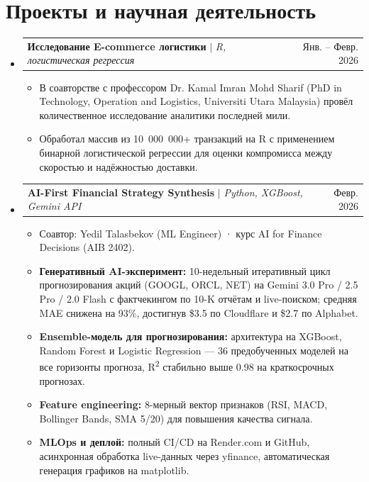 \documentclass[letterpaper,11pt]{article}
\makeatletter
\newcommand{\resumeItem}[1]{
  \item\small{
    {#1 \vspace{-2pt}}
  }
}
\newcommand{\resumeProjectHeading}[2]{
    \item
    \begin{tabular*}{0.97\textwidth}{l@{\extracolsep{\fill}}r}
      \small#1 & #2 \\
    \end{tabular*}\vspace{-7pt}
}
\newcommand{\resumeSubHeadingListStart}{\begin{itemize}[leftmargin=0.15in, label={}]}
\newcommand{\resumeSubHeadingListEnd}{\end{itemize}}
\newcommand{\resumeItemListStart}{\begin{itemize}}
\newcommand{\resumeItemListEnd}{\end{itemize}\vspace{-5pt}}
\makeatother
\begin{document}
\section{Проекты и научная деятельность}
    \resumeSubHeadingListStart
      \resumeProjectHeading
          {\textbf{Исследование E-commerce логистики} $|$ \emph{R, логистическая регрессия}}{Янв. -- Февр. 2026}
          \resumeItemListStart
            \resumeItem{В соавторстве с профессором Dr. Kamal Imran Mohd Sharif (PhD in Technology, Operation and Logistics, Universiti Utara Malaysia) провёл количественное исследование аналитики последней мили.}
            \resumeItem{Обработал массив из 10~000~000+ транзакций на R с применением бинарной логистической регрессии для оценки компромисса между скоростью и надёжностью доставки.}
          \resumeItemListEnd
      \resumeProjectHeading
          {\textbf{AI-First Financial Strategy Synthesis} $|$ \emph{Python, XGBoost, Gemini API}}{Февр. 2026}
          \resumeItemListStart
            \resumeItem{Соавтор: Yedil Talasbekov (ML Engineer) · курс AI for Finance Decisions (AIB 2402).}
            \resumeItem{\textbf{Генеративный AI-эксперимент:} 10-недельный итеративный цикл прогнозирования акций (GOOGL, ORCL, NET) на Gemini 3.0 Pro / 2.5 Pro / 2.0 Flash с фактчекингом по 10-K отчётам и live-поиском; средняя MAE снижена на 93\%, достигнув \$3.5 по Cloudflare и \$2.7 по Alphabet.}
            \resumeItem{\textbf{Ensemble-модель для прогнозирования:} архитектура на XGBoost, Random Forest и Logistic Regression — 36 предобученных моделей на все горизонты прогноза, R\textsuperscript{2} стабильно выше 0.98 на краткосрочных прогнозах.}
            \resumeItem{\textbf{Feature engineering:} 8-мерный вектор признаков (RSI, MACD, Bollinger Bands, SMA 5/20) для повышения качества сигнала.}
            \resumeItem{\textbf{MLOps и деплой:} полный CI/CD на Render.com и GitHub, асинхронная обработка live-данных через yfinance, автоматическая генерация графиков на matplotlib.}
          \resumeItemListEnd
    \resumeSubHeadingListEnd


\end{document}
